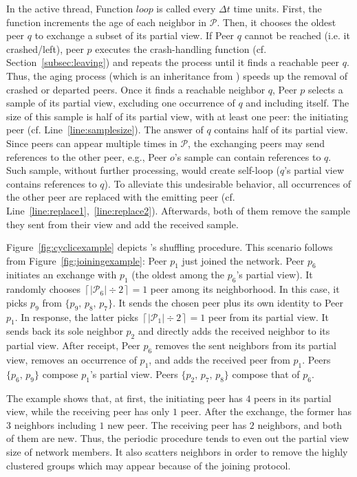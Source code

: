 In the active thread, Function $loop$ is called every $\Delta t$ time
units. First, the function increments the age of each neighbor in
$\mathcal{P}$. Then, it chooses the oldest peer $q$ to exchange a
subset of its partial view. If Peer $q$ cannot be reached (i.e. it
crashed/left), peer $p$ executes the crash-handling function
(cf. Section~\ref{subsec:leaving}) and repeats the process until it
finds a reachable peer $q$. Thus, the aging process (which is an
inheritance from \CYCLON) speeds up the removal of crashed or departed
peers. Once it finds a reachable neighbor $q$, Peer $p$ selects a
sample of its partial view, excluding one occurrence of $q$ and
including itself. The size of this sample is half of its partial view,
with at least one peer: the initiating peer
(cf. Line~\ref{line:samplesize}). The answer of $q$ contains half of
its partial view. Since peers can appear multiple times in
$\mathcal{P}$, the exchanging peers may send references to the other
peer, e.g., Peer $o$'s sample can contain references to $q$. Such
sample, without further processing, would create self-loop ($q$'s
partial view contains references to $q$). To alleviate this
undesirable behavior, all occurrences of the other peer are replaced
with the emitting peer
(cf. Line~\ref{line:replace1},~\ref{line:replace2}).  Afterwards, both
of them remove the sample they sent from their view and add the
received sample.

Figure~\ref{fig:cyclicexample} depicts \SPRAY's shuffling
procedure. This scenario follows from Figure~\ref{fig:joiningexample}:
Peer $p_1$ just joined the network. Peer $p_6$ initiates an exchange
with $p_1$ (the oldest among the $p_6$'s partial view). It randomly
chooses $\left\lceil{|\mathcal{P}_6|\div 2}\right\rceil = 1$ peer
among its neighborhood. In this case, it picks $p_9$ from
$\{p_9,\,p_8,\,p_7\}$.  It sends the chosen peer plus its own identity
to Peer $p_1$. In response, the latter picks
$\left\lceil{|\mathcal{P}_1|\div 2}\right\rceil = 1$ peer from its
partial view. It sends back its sole neighbor $p_2$ and directly adds
the received neighbor to its partial view. After receipt, Peer $p_6$
removes the sent neighbors from its partial view, removes an
occurrence of $p_1$, and adds the received peer from $p_1$. Peers
$\{p_6,\,p_9\}$ compose $p_1$'s partial view. Peers
$\{p_2,\,p_7,\,p_8\}$ compose that of $p_6$.

The example shows that, at first, the initiating peer has $4$ peers in
its partial view, while the receiving peer has only $1$ peer.
After the exchange, the former has $3$ neighbors including $1$ new
peer. The receiving peer has $2$ neighbors, and both of them are
new. Thus, the periodic procedure tends to even out the partial view
size of network members. It also scatters neighbors in order to remove
the highly clustered groups which may appear because of the joining
protocol.

